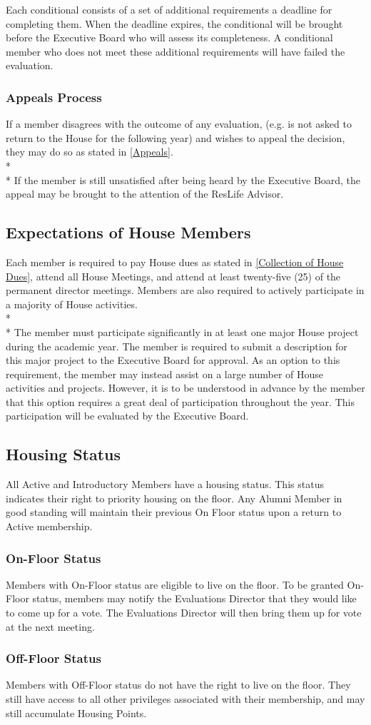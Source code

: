 \documentclass{article}
\newcommand{\bsection}[1]{\subsection{#1} \label{#1}}
\newcommand{\bsubsection}[1]{\subsubsection{#1} \label{#1}}
\begin{document}
Each conditional consists of a set of additional requirements a deadline for completing them.
When the deadline expires, the conditional will be brought before the Executive Board who will assess its completeness.
A conditional member who does not meet these additional requirements will have failed the evaluation.
\bsubsection{Appeals Process}
If a member disagrees with the outcome of any evaluation, (e.g. is not asked to return to the House for the following year) and wishes to appeal the decision, they may do so as stated in \ref{Appeals}.
\\* \\*
If the member is still unsatisfied after being heard by the Executive Board, the appeal may be brought to the attention of the ResLife Advisor.

\bsection{Expectations of House Members}
Each member is required to pay House dues as stated in \ref{Collection of House Dues}, attend all House Meetings, and attend at least twenty-five (25) of the permanent director meetings.
Members are also required to actively participate in a majority of House activities.
\\* \\*
The member must participate significantly in at least one major House project during the academic year.
The member is required to submit a description for this major project to the Executive Board for approval.
As an option to this requirement, the member may instead assist on a large number of House activities and projects.
However, it is to be understood in advance by the member that this option requires a great deal of participation throughout the year.
This participation will be evaluated by the Executive Board.

\bsection{Housing Status}
All Active and Introductory Members have a housing status.
This status indicates their right to priority housing on the floor.
Any Alumni Member in good standing will maintain their previous On Floor status upon a return to Active membership.
\bsubsection{On-Floor Status}
Members with On-Floor status are eligible to live on the floor.
To be granted On-Floor status, members may notify the Evaluations Director that they would like to come up for a vote.
The Evaluations Director will then bring them up for vote at the next meeting.
\bsubsection{Off-Floor Status}
Members with Off-Floor status do not have the right to live on the floor.
They still have access to all other privileges associated with their membership, and may still accumulate Housing Points.
\end{document}
